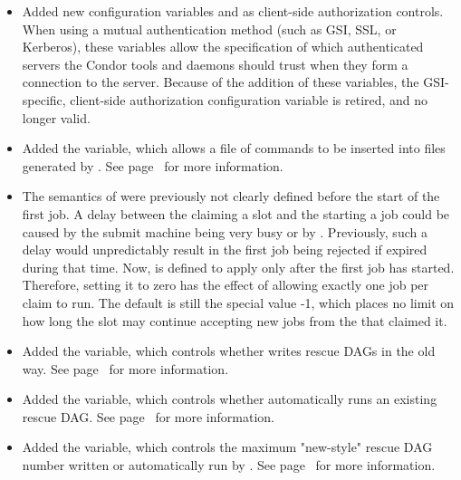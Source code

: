 \begin{itemize}

\item Added new configuration variables
   and  as
  client-side authorization controls.
  When using a mutual authentication method (such as GSI, SSL, or Kerberos),
  these variables allow the specification of
  which authenticated servers the Condor tools and daemons should
  trust when they form a connection to the server.
  Because of the addition of these variables,
  the GSI-specific, client-side authorization configuration variable
   is retired, and no longer valid.

\item Added the  variable, which allows a file
  of commands to be inserted into  files generated
  by .  See page~\pageref{param:DAGManInsertSubFile}
  for more information.

\item The semantics of  were previously not
clearly defined before the start of the first job.  A delay between
the  claiming a slot and the  starting a
job could be caused by the submit machine being very busy or by
.  Previously, such a delay would
unpredictably result in the first job being rejected if
 expired during that time.  Now,
 is defined to apply only after the first job
has started.  Therefore, setting it to zero has the effect of allowing
exactly one job per claim to run.  The default is still the special
value -1, which places no limit on how long the slot may continue
accepting new jobs from the  that claimed it.

\item Added the  variable, which controls whether
 writes rescue DAGs in the old way.  See
page~\pageref{param:DAGManOldRescue} for more information.

\item Added the  variable, which controls
whether  automatically runs an existing rescue DAG.
See page~\pageref{param:DAGManAutoRescue} for more information.

\item Added the  variable, which
controls the maximum "new-style" rescue DAG number written or
automatically run by .
See page~\pageref{param:DAGManMaxRescueNum} for more information.

\end{itemize}

